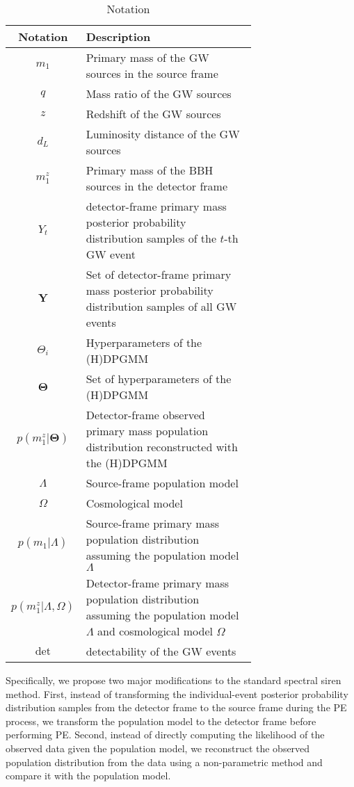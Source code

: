 \documentclass[twocolumn]{aastex631}
\begin{document}
\begin{table}
    \caption{Notation}
    \begin{ruledtabular}
        \begin{tabular}{c>{\raggedright\arraybackslash}p{0.7\linewidth}}
            Notation & Description \\
            \hline
            $m_1$ & Primary mass of the \ac{GW} sources in the source frame \\
            $q$ & Mass ratio of the \ac{GW} sources \\
            $z$ & Redshift of the \ac{GW} sources \\
            $d_L$ & Luminosity distance of the \ac{GW} sources \\
            $m^z_1$ & Primary mass of the \ac{BBH} sources in the detector frame \\
            $Y_t$ & detector-frame primary mass posterior probability distribution samples of the $t$-th \ac{GW} event \\
            $\mathbf{Y}$ & Set of detector-frame primary mass posterior probability distribution samples of all \ac{GW} events \\
            $\Theta_i$ & Hyperparameters of the \ac{(H)DPGMM} \\
            $\mathbf{\Theta}$ & Set of hyperparameters of the \ac{(H)DPGMM} \\
            $p(m^z_1|\mathbf{\Theta})$ & Detector-frame observed primary mass population distribution reconstructed with the \ac{(H)DPGMM} \\
            $\Lambda$ & Source-frame population model \\
            $\Omega$ & Cosmological model \\
            $p(m_1|\Lambda)$ & Source-frame primary mass population distribution assuming the population model $\Lambda$ \\
            $p(m^z_1|\Lambda, \Omega)$ & Detector-frame primary mass population distribution assuming the population model $\Lambda$ and cosmological model $\Omega$ \\
            $\mathrm{det}$ & detectability of the \ac{GW} events \\
        \end{tabular}
    \end{ruledtabular}
    \label{tab:notation}
\end{table}

Specifically, we propose two major modifications to the standard spectral siren method.
First, instead of transforming the individual-event posterior probability distribution samples from the detector frame to the source frame during the \ac{PE} process, we transform the population model to the detector frame before performing \ac{PE}.
Second, instead of directly computing the likelihood of the observed data given the population model, we reconstruct the observed population distribution from the data using a non-parametric method and compare it with the population model.
\end{document}
